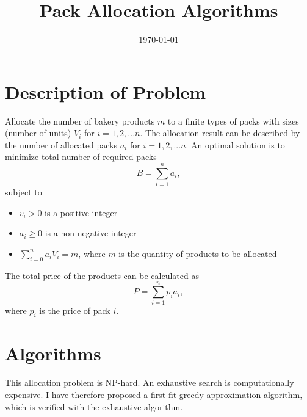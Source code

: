 \documentclass[a4paper]{article}
\begin{document}
\title{\Huge Pack Allocation Algorithms}


\date{\today}


\maketitle

\label{firstpage}
\section{Description of Problem}

Allocate the number of bakery products $m$ to a finite types of packs with sizes
(number of units) $V_i$ for $i=1, 2, ... n$. The allocation result can be described by the number of allocated packs $a_i$ for $i=1, 2, ... n$. An optimal solution is to minimize total number of required packs
$$B = \sum_{i=1}^n a_i,$$
subject to
\begin{itemize}
   \item $v_i > 0$ is a positive integer
   \item $a_i \geq 0$ is a non-negative integer
   \item $\sum_{i=0}^n a_i V_i = m$, where $m$ is the quantity of products to be allocated
\end{itemize}
The total price of the products can be calculated as
$$P = \sum_{i=1}^n p_i a_i,$$ where $p_i$ is the price of pack $i$.
\section{Algorithms}
This allocation problem is NP-hard. An exhaustive search is computationally expensive. I have therefore proposed a first-fit greedy approximation algorithm, which is verified with the exhaustive algorithm.
\end{document}
